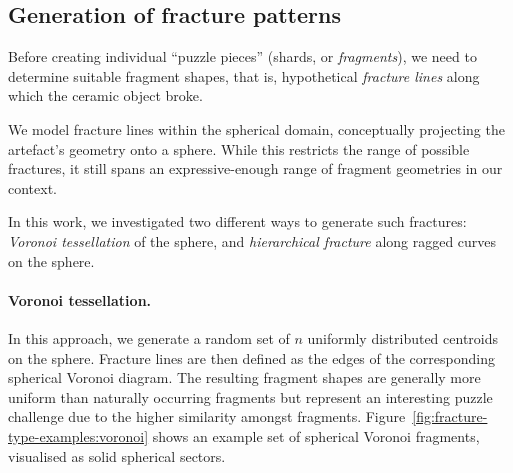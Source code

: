 \documentclass[acmlarge,screen,dvipsnames]{acmart}
\begin{document}
%

%
%

\greenBegin

\subsection{Generation of fracture patterns}
\label{sec:fracture-patterns}

Before creating individual ``puzzle pieces'' (shards,
or \emph{fragments}), we need to determine suitable fragment shapes, that
is, hypothetical \emph{fracture lines} along which the ceramic object broke.

We model fracture lines within the spherical domain, conceptually
projecting the artefact's geometry onto a sphere. While this restricts the
range of possible fractures, it still spans an expressive-enough range
of fragment geometries in our context.

In this work, we investigated two different ways to generate such
fractures: \emph{Voronoi tessellation} of the sphere, and
\emph{hierarchical fracture} along ragged curves on the sphere.

\paragraph{Voronoi tessellation.}
%
In this approach, we generate a random set of $n$ uniformly
distributed centroids on the sphere. Fracture lines are then defined
as the edges of the corresponding spherical Voronoi diagram.
%
The resulting fragment shapes are generally more uniform than
naturally occurring fragments but represent an interesting
puzzle challenge due to the higher similarity amongst fragments.
%
Figure~\ref{fig:fracture-type-examples:voronoi} shows an example set
of spherical Voronoi fragments, visualised as solid spherical sectors.
\end{document}
